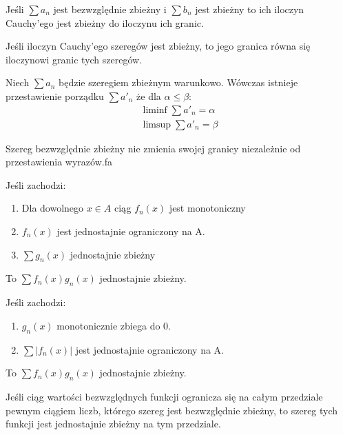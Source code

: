 \begin{theorem}[Mertensa]
    Jeśli $\sum a_n$ jest bezwzględnie zbieżny i $\sum b_n$ jest zbieżny to ich iloczyn Cauchy'ego jest zbieżny do iloczynu ich granic.
\end{theorem}

\begin{theorem}[Abela]
    Jeśli iloczyn Cauchy'ego szeregów jest zbieżny, to jego granica równa się iloczynowi granic tych szeregów.
\end{theorem}

\begin{theorem}[Riemanna]
    Niech $\sum a_n$ będzie szeregiem zbieżnym warunkowo. Wówczas istnieje przestawienie porządku $\sum a'_n$ że dla $\alpha \leq \beta$:
    \begin{align*}
        \liminf \sum a'_n = \alpha \\ \limsup \sum a'_n = \beta
    \end{align*}
\end{theorem}

\begin{corollary}
    Szereg bezwzględnie zbieżny nie zmienia swojej granicy niezależnie od przestawienia wyrazów.fa
\end{corollary}

\begin{condition}[Abela]
Jeśli zachodzi:
\begin{enumerate}
    \item Dla dowolnego $x \in A$ ciąg $f_n(x)$ jest monotoniczny
    \item $f_n(x)$ jest jednostajnie ograniczony na A.
    \item $\sum g_n(x)$ jednostajnie zbieżny
\end{enumerate}
To $\sum f_n(x) g_n(x)$ jednostajnie zbieżny.
\end{condition}

\begin{condition}[Dirichleta]
Jeśli zachodzi:
\begin{enumerate}
    \item $g_n(x)$ monotonicznie zbiega do 0.
    \item $\sum | f_n(x) |$ jest jednostajnie ograniczony na A.
\end{enumerate}
To $\sum f_n(x) g_n(x)$ jednostajnie zbieżny.

\begin{condition}[Weierstrassa]
    Jeśli ciąg wartości bezwzględnych funkcji ogranicza się na całym przedziale pewnym ciągiem liczb, którego szereg jest bezwzględnie zbieżny, to szereg tych funkcji jest jednostajnie zbieżny na tym przedziale.
\end{condition}

\end{condition}

